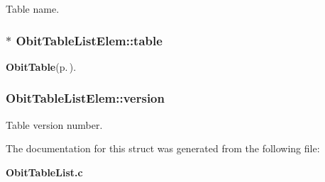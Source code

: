 Table name. 

\subsubsection{$\ast$ {\bf Obit\-Table\-List\-Elem::table}}\label{structObitTableListElem_o2}


{\bf Obit\-Table}{\rm (p.\,\pageref{structObitTable})}. 

\subsubsection{ {\bf Obit\-Table\-List\-Elem::version}}\label{structObitTableListElem_o1}


Table version number. 



The documentation for this struct was generated from the following file:\begin{CompactItemize}
\item 
{\bf Obit\-Table\-List.c}\end{CompactItemize}
